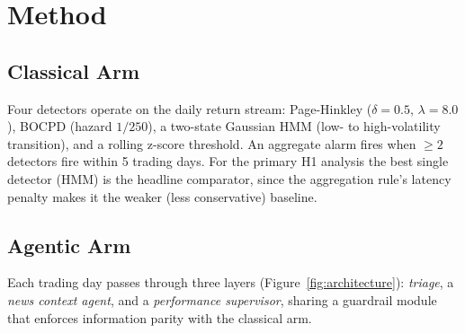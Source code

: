 \documentclass[10pt,a4paper]{article}
\begin{document}
\section{Method}\label{sec:method}

\subsection{Classical Arm}\label{sec:method-classical}

Four detectors operate on the daily return stream: Page-Hinkley
($\delta = 0.5$, $\lambda = 8.0$), BOCPD (hazard $1/250$), a two-state Gaussian
HMM (low- to high-volatility transition), and a rolling z-score threshold. An
aggregate alarm fires when ${\geq}2$ detectors fire within 5 trading days. For
the primary H1 analysis the best single detector (HMM) is the headline
comparator, since the aggregation rule's latency penalty makes it the weaker
(less conservative) baseline.

\subsection{Agentic Arm}\label{sec:method-agentic}

Each trading day passes through three layers (Figure~\ref{fig:architecture}):
\emph{triage}, a \emph{news context agent}, and a \emph{performance supervisor},
sharing a guardrail module that enforces information parity with the classical
arm.
\end{document}
